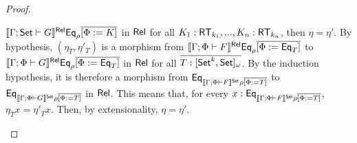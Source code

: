 \documentclass[acmsmall,review,anonymous]{acmart}
\theoremstyle{definition}
\begin{document}
\begin{proof}
\begin{itemize}
$\llbracket{\Gamma ; {\mathsf{Set}}\vdash G}\rrbracket^{\mathsf{Rel}} \mathsf{Eq}_{\rho}\overline{[\Phi := K]}$
in ${\mathsf{Rel}}$ for all $K_1 : {\mathsf{RT}}_{k_1},...,K_n : {\mathsf{RT}}_{k_n}$,
then $\eta = \eta'$. By hypothesis, $(\eta_{\overline{T}},
\eta'_{\overline{T}})$ is a morphism from $\llbracket{\Gamma; \Phi
  \vdash F}\rrbracket^{\mathsf{Rel}} \mathsf{Eq}_{\rho}\overline{[\Phi := \mathsf{Eq}_{T}]}$ to
$\llbracket{\Gamma ; \Phi \vdash G}\rrbracket^{\mathsf{Rel}} \mathsf{Eq}_{\rho}\overline{[\Phi :=
    \mathsf{Eq}_{T}]}$ in ${\mathsf{Rel}}$ for all $\overline{T :
  [{\mathsf{Set}}^k,{\mathsf{Set}}]_{\omega}}$.  By the induction hypothesis, it is
therefore a morphism from $\mathsf{Eq}_{\llbracket{\Gamma; \Phi \vdash F}\rrbracket^{\mathsf{Set}}
  \rho\overline{[\Phi := T]}}$ to $\mathsf{Eq}_{\llbracket{\Gamma; \Phi \vdash
    G}\rrbracket^{\mathsf{Set}} \rho\overline{[\Phi := T]}}$ in ${\mathsf{Rel}}$. This means that, for
every $x : \mathsf{Eq}_{\llbracket{\Gamma; \Phi \vdash F}\rrbracket^{\mathsf{Set}} \rho\overline{[\Phi :=
      T]}}$, $\eta_{\overline{T}}x = \eta'_{\overline{T}}x$.  Then, by
extensionality, $\eta = \eta'$.


\end{itemize}
\end{proof}
\end{document}
